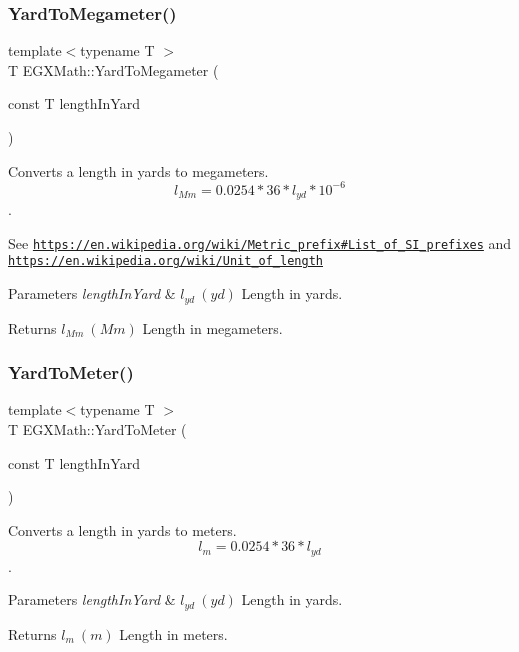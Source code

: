 \subsubsection{\texorpdfstring{Yard\+To\+Megameter()}{YardToMegameter()}}
{\footnotesize\ttfamily template$<$typename T $>$ \\
T E\+G\+X\+Math\+::\+Yard\+To\+Megameter (\begin{DoxyParamCaption}\item[{const T}]{length\+In\+Yard }\end{DoxyParamCaption})}



Converts a length in yards to megameters. \[ l_{Mm}=0.0254 * 36 * l_{yd} * 10^{-6} \]. 

See \href{https://en.wikipedia.org/wiki/Metric_prefix#List_of_SI_prefixes}{\tt https\+://en.\+wikipedia.\+org/wiki/\+Metric\+\_\+prefix\#\+List\+\_\+of\+\_\+\+S\+I\+\_\+prefixes} and \href{https://en.wikipedia.org/wiki/Unit_of_length}{\tt https\+://en.\+wikipedia.\+org/wiki/\+Unit\+\_\+of\+\_\+length} 
\begin{DoxyParams}{Parameters}
{\em length\+In\+Yard} & $ l_{yd}\ (yd)$ Length in yards. \\
\hline
\end{DoxyParams}
\begin{DoxyReturn}{Returns}
$ l_{Mm}\ (Mm)$ Length in megameters. 
\end{DoxyReturn}
\mbox{\label{group___e_g_x_math-_conversions-_length_conversions-_imperial-_yard-_s_i_gadd64039dca326950457e402fc0695083}} 
\subsubsection{\texorpdfstring{Yard\+To\+Meter()}{YardToMeter()}}
{\footnotesize\ttfamily template$<$typename T $>$ \\
T E\+G\+X\+Math\+::\+Yard\+To\+Meter (\begin{DoxyParamCaption}\item[{const T}]{length\+In\+Yard }\end{DoxyParamCaption})}



Converts a length in yards to meters. \[ l_{m}=0.0254 * 36 * l_{yd} \]. 


\begin{DoxyParams}{Parameters}
{\em length\+In\+Yard} & $ l_{yd}\ (yd)$ Length in yards. \\
\hline
\end{DoxyParams}
\begin{DoxyReturn}{Returns}
$ l_{m}\ (m)$ Length in meters. 
\end{DoxyReturn}
\mbox{\label{group___e_g_x_math-_conversions-_length_conversions-_imperial-_yard-_s_i_ga9197b0613b2b3a04b62d194f04bb3692}} 
